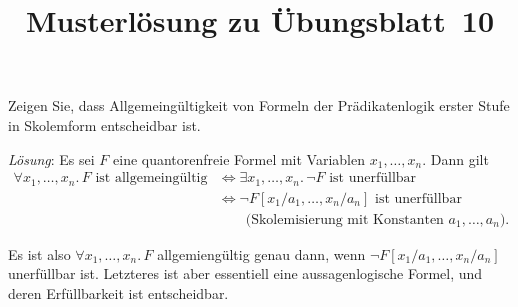 \documentclass[german]{latteachCD}[2017/03/28]
\title{Musterlösung zu Übungsblatt~10}
\begin{document}
\maketitle

\vspace*{0.5\baselineskip}
\setcounter{exercise}{3}
\justifying

\begin{exercise}
  Zeigen Sie, dass Allgemeingültigkeit von Formeln der Prädikatenlogik erster
  Stufe in Skolemform entscheidbar ist.
\end{exercise}

\emph{Lösung}\/: Es sei $F$ eine quantorenfreie Formel mit Variablen
$x_{1},\dots, x_{n}$.  Dann gilt
\begin{align*}
  \forall x_{1},\dots, x_{n}.\,F \text{ ist allgemeingültig}
  &\iff \exists x_{1},\dots,x_{n}.\,\neg F \text{ ist unerfüllbar}\\
  &\iff \neg F[x_{1}/a_{1},\dots,x_{n}/a_{n}] \text{ ist unerfüllbar}\\
  &\phantom{\iff}\:\: \text{(Skolemisierung mit Konstanten $a_{1},\dots,a_{n}$).}
\end{align*}

Es ist also $\forall x_{1},\ldots,x_{n}.\,F$ allgemiengültig genau dann, wenn
$\neg F[x_{1}/a_{1},\dots,x_{n}/a_{n}]$ unerfüllbar ist.  Letzteres ist aber
essentiell eine aussagenlogische Formel, und deren Erfüllbarkeit ist
entscheidbar.
\end{document}
